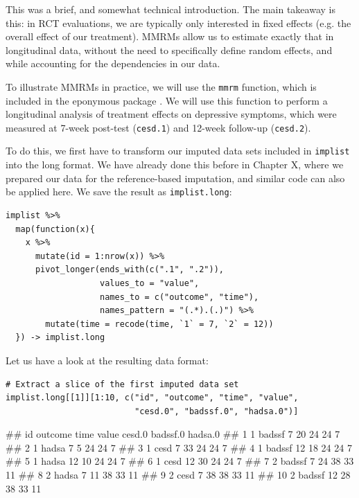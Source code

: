 This was a brief, and somewhat technical introduction. The main takeaway is this: in RCT evaluations, we are typically only interested in fixed effects (e.g. the overall effect of our treatment). MMRMs allow us to estimate exactly that in longitudinal data, without the need to specifically define random effects, and while accounting for the dependencies in our data.

To illustrate MMRMs in practice, we will use the \texttt{mmrm} function, which is included in the eponymous package \citep{mmrm}. We will use this function to perform a longitudinal analysis of treatment effects on depressive symptoms, which were measured at 7-week post-test (\texttt{cesd.1}) and 12-week follow-up (\texttt{cesd.2}).

To do this, we first have to transform our imputed data sets included in \texttt{implist} into the long format. We have already done this before in Chapter X, where we prepared our data for the reference-based imputation, and similar code can also be applied here. We save the result as \texttt{implist.long}:

\begin{lstlisting}
implist %>% 
  map(function(x){
    x %>% 
      mutate(id = 1:nrow(x)) %>% 
      pivot_longer(ends_with(c(".1", ".2")),
                   values_to = "value",
                   names_to = c("outcome", "time"),
                   names_pattern = "(.*).(.)") %>% 
        mutate(time = recode(time, `1` = 7, `2` = 12))
  }) -> implist.long
\end{lstlisting}

Let us have a look at the resulting data format:

\begin{lstlisting}
# Extract a slice of the first imputed data set
implist.long[[1]][1:10, c("id", "outcome", "time", "value", 
                          "cesd.0", "badssf.0", "hadsa.0")]
\end{lstlisting}

\begin{example}
##       id outcome  time value cesd.0 badssf.0 hadsa.0
##  1     1 badssf      7    20     24       24       7
##  2     1 hadsa       7     5     24       24       7
##  3     1 cesd        7    33     24       24       7
##  4     1 badssf     12    18     24       24       7
##  5     1 hadsa      12    10     24       24       7
##  6     1 cesd       12    30     24       24       7
##  7     2 badssf      7    24     38       33      11
##  8     2 hadsa       7    11     38       33      11
##  9     2 cesd        7    38     38       33      11
## 10     2 badssf     12    28     38       33      11
\end{example}

